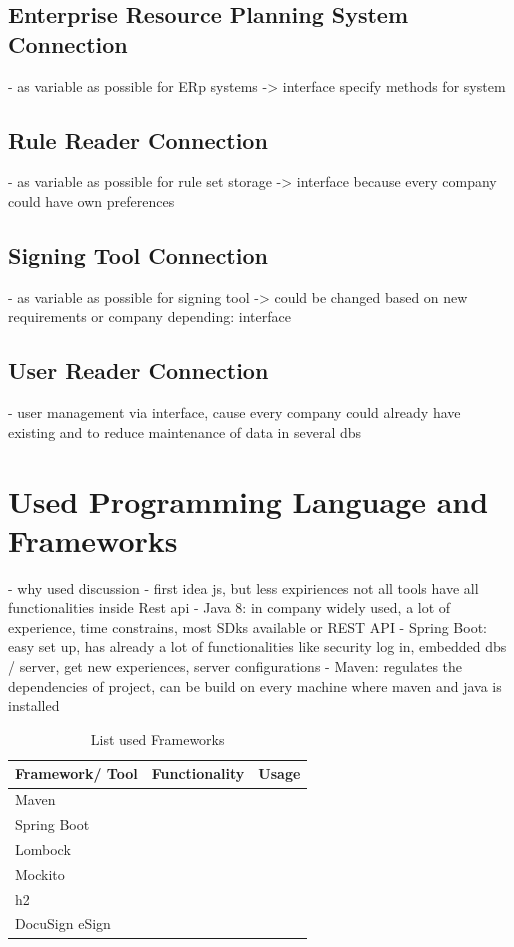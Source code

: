 \subsection*{Enterprise Resource Planning System Connection}
- as variable as possible for ERp systems -> interface specify methods for system

\subsection*{Rule Reader Connection}
- as variable as possible for rule set storage -> interface because every company could have own preferences

\subsection*{Signing Tool Connection}
- as variable as possible for signing tool -> could be changed based on new requirements or company depending: interface

\subsection*{User Reader Connection}
- user management via interface, cause every company could already have existing and to reduce maintenance of data in several dbs 

\section{Used Programming Language and Frameworks}
- why used discussion
- first idea js, but less expiriences not all tools have all functionalities inside Rest api
- Java 8: in company widely used, a lot of experience, time constrains, most SDks available or REST API
- Spring Boot: easy set up, has already a lot of functionalities like security log in, embedded dbs / server, get new experiences, server configurations
- Maven: regulates the dependencies of project, can be build on every machine where maven and java is installed

\begin{table}[h!]
	\begin{tabular}{|l|c|c|} \hline
		Framework/ Tool & Functionality & Usage \\ \hline
		Maven & & \\ \hline
		Spring Boot & & \\ \hline
		Lombock & & \\ \hline
		Mockito & & \\ \hline
		h2 & & \\ \hline
		DocuSign eSign & & \\ \hline
	\end{tabular}
	\centering
	\caption{List used Frameworks}
	\label{tab:frameworks}
\end{table}

